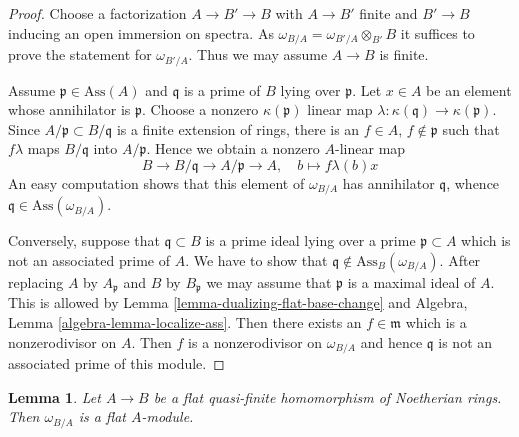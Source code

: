 \documentclass{stacks-project}
\theoremstyle{plain}
\newtheorem{lemma}[subsection]{Lemma}
\theoremstyle{definition}
\theoremstyle{remark}
\numberwithin{equation}{subsection}
\begin{document}
\begin{proof}
Choose a factorization $A \to B' \to B$ with $A \to B'$ finite and
$B' \to B$ inducing an open immersion on spectra. As
$\omega_{B/A} = \omega_{B'/A} \otimes_{B'} B$ it suffices
to prove the statement for $\omega_{B'/A}$. Thus we may assume $A \to B$
is finite.

\medskip\noindent
Assume $\mathfrak p \in \text{Ass}(A)$ and $\mathfrak q$ is a prime
of $B$ lying over $\mathfrak p$. Let $x \in A$ be an element whose
annihilator is $\mathfrak p$. Choose a nonzero $\kappa(\mathfrak p)$
linear map $\lambda : \kappa(\mathfrak q) \to \kappa(\mathfrak p)$.
Since $A/\mathfrak p \subset B/\mathfrak q$ is a finite extension
of rings, there is an $f \in A$, $f \not \in \mathfrak p$
such that $f\lambda$ maps $B/\mathfrak q$ into $A/\mathfrak p$.
Hence we obtain a nonzero $A$-linear map
$$
B \to B/\mathfrak q \to A/\mathfrak p \to A,\quad
b \mapsto f\lambda(b)x
$$
An easy computation shows that this element of $\omega_{B/A}$
has annihilator $\mathfrak q$, whence
$\mathfrak q \in \text{Ass}(\omega_{B/A})$.

\medskip\noindent
Conversely, suppose that $\mathfrak q \subset B$ is a prime ideal
lying over a prime $\mathfrak p \subset A$ which is not an associated
prime of $A$. We have to show that
$\mathfrak q \not \in \text{Ass}_B(\omega_{B/A})$.
After replacing $A$ by $A_\mathfrak p$ and $B$ by
$B_\mathfrak p$ we may assume that $\mathfrak p$ is a maximal ideal
of $A$. This is allowed by Lemma \ref{lemma-dualizing-flat-base-change} and
Algebra, Lemma \ref{algebra-lemma-localize-ass}.
Then there exists an $f \in \mathfrak m$
which is a nonzerodivisor on $A$.
Then $f$ is a nonzerodivisor on $\omega_{B/A}$
and hence $\mathfrak q$ is not an associated prime of this module.
\end{proof}

\begin{lemma}
\label{lemma-dualizing-base-flat-flat}
Let $A \to B$ be a flat quasi-finite homomorphism of Noetherian rings.
Then $\omega_{B/A}$ is a flat $A$-module.
\end{lemma}
\end{document}

